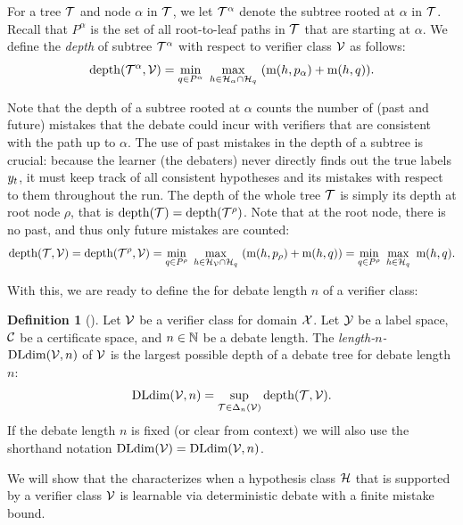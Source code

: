 \documentclass[11pt,letterpaper]{article}
\theoremstyle{definition}
\newtheorem{definition}[theorem]{Definition}
\theoremstyle{plain}
\begin{document}
For a tree ${\mathcal T}$ and node $\alpha$ in ${\mathcal T}$, we let ${\mathcal T}^\alpha$ denote the subtree rooted at $\alpha$ in ${\mathcal T}$. Recall that $P^\alpha$ is the set of all root-to-leaf paths in ${\mathcal T}$ that are starting at $\alpha$.
We define the \emph{depth} of subtree ${\mathcal T}^\alpha$ with respect to verifier class ${\mathcal V}$ as follows:
\[
\mathrm{depth}({\mathcal T}^\alpha, {\mathcal V}) = \min_{q\in P^\alpha}~ \max_{h\in {{\mathcal H}}_\alpha \cap {{\mathcal H}}_q}~  ( \mathrm{m}(h, p_\alpha) + \mathrm{m}(h, q) ).
\]

Note that the depth of a subtree rooted at $\alpha$ counts the number of (past and future) mistakes that the debate could incur with verifiers that are consistent with the path up to $\alpha$.
The use of past mistakes in the depth of a subtree is crucial: because the learner (the debaters) never directly finds out the true  labels $y_t$, it must keep track of all consistent hypotheses and its mistakes with respect to them throughout the run.
The depth of the whole tree ${\mathcal T}$ is simply its depth at root node $\rho$, that is $\mathrm{depth}({\mathcal T}) = \mathrm{depth}({\mathcal T}^\rho)$. Note that at the root node, there is no past, and thus only future mistakes are counted:
\[
\mathrm{depth}({\mathcal T},{\mathcal V}) = \mathrm{depth}({\mathcal T}^\rho,{\mathcal V}) = \min_{q\in P^\rho}~ \max_{h\in {{\mathcal H}}_{\mathcal V} \cap {{\mathcal H}}_q}~  ( \mathrm{m}(h, p_\rho) + \mathrm{m}(h, q) )  = \min_{q\in P^\rho}~ \max_{h\in {{\mathcal H}}_{q}}~    \mathrm{m}(h, q).
\]

%
With this, we are ready to define the \emph{\debatedimname} for debate length $n$ of a verifier class:
\begin{definition}[\debatedimname]
 Let ${\mathcal V}$ be a verifier class for domain ${\mathcal X}$. Let ${\mathcal Y}$ be a label space, ${{\mathcal C}}$ be a certificate space, and $n\in\mathbb{N}$ be a debate length. The \emph{length-$n$-\debatedimname} $\mathrm{DLdim}({\mathcal V}, n)$ of ${\mathcal V}$ is the largest possible depth of a debate tree for debate length $n$:
 \[
  \mathrm{DLdim}({\mathcal V}, n) = \sup_{{\mathcal T}\in\Delta_n({\mathcal V})} \mathrm{depth}({\mathcal T},{\mathcal V}).
 \]
If the debate length $n$ is fixed (or clear from context) we will also use the shorthand notation $\mathrm{DLdim}({\mathcal V}) =   \mathrm{DLdim}({\mathcal V}, n)$.
\end{definition}
We will show that the \debatedimname characterizes when a hypothesis class ${{\mathcal H}}$ that is supported by a verifier class ${\mathcal V}$ is learnable via deterministic debate with a finite mistake bound. 
\end{document}
